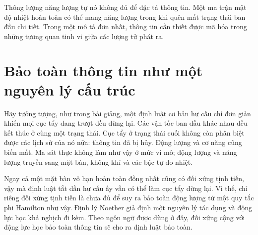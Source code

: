 Thông lượng năng lượng tự nó không đủ để đặc tả thông tin. Một ma trận mật độ nhiệt hoàn toàn có thể mang năng lượng trong khi quên mất trạng thái ban đầu chi tiết. Trong một mô tả đơn nhất, thông tin cần thiết được mã hóa trong những tương quan tinh vi giữa các lượng tử phát ra.

\section{Bảo toàn thông tin như một nguyên lý cấu trúc}

\begin{classroomqa}
\end{classroomqa}

Hãy tưởng tượng, như trong bài giảng, một định luật cơ bản hư cấu chỉ đơn giản khiến mọi cục tẩy đang trượt đều dừng lại. Các vận tốc ban đầu khác nhau đều kết thúc ở cùng một trạng thái. Cục tẩy ở trạng thái cuối không còn phân biệt được các lịch sử của nó nữa: thông tin đã bị hủy. Động lượng và cơ năng cũng biến mất. Ma sát thực không làm như vậy ở mức vi mô; động lượng và năng lượng truyền sang mặt bàn, không khí và các bậc tự do nhiệt.

Ngay cả một mặt bàn vô hạn hoàn toàn đồng nhất cũng có đối xứng tịnh tiến, vậy mà định luật tắt dần hư cấu ấy vẫn có thể làm cục tẩy dừng lại. Vì thế, chỉ riêng đối xứng tịnh tiến là chưa đủ để suy ra bảo toàn động lượng từ một quy tắc phi Hamilton như vậy. Định lý Noether giả định một nguyên lý tác dụng và động lực học khả nghịch đi kèm. Theo ngôn ngữ được dùng ở đây, đối xứng cộng với động lực học bảo toàn thông tin sẽ cho ra định luật bảo toàn.

\begin{classroomqa}
\end{classroomqa}

